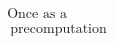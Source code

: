 \documentclass[preview]{standalone}
\begin{document}
\begin{align*}
\text{Once as a} \\\ \text{precomputation}
\end{align*}
\end{document}
